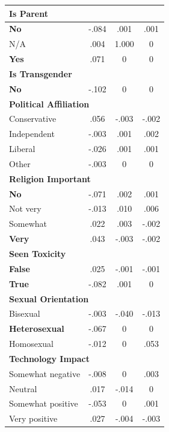 \documentclass{article} %
\theoremstyle{definition}
\theoremstyle{plain}
\begin{document}
\begin{table}[t]
\begin{tabular}{l c c c}
		\multicolumn{4}{l}{\textbf{Is Parent}} \\
		\midrule
		\textbf{No} & -.084 & .001 & .001 \\
		N/A & .004 & 1.000 & 0 \\
		\textbf{Yes} & .071 & 0 & 0 \\
		\midrule
		
		\multicolumn{4}{l}{\textbf{Is Transgender}} \\
		\midrule
		\textbf{No} & -.102 & 0 & 0 \\
		\midrule
		
		\multicolumn{4}{l}{\textbf{Political Affiliation}} \\
		\midrule
		Conservative & .056 & -.003 & -.002 \\
		Independent & -.003 & .001 & .002 \\
		Liberal & -.026 & .001 & .001 \\
		Other & -.003 & 0 & 0 \\
		\midrule
		
		\multicolumn{4}{l}{\textbf{Religion Important}} \\
		\midrule
		\textbf{No} & -.071 & .002 & .001 \\
		Not very & -.013 & .010 & .006 \\
		Somewhat & .022 & .003 & -.002 \\
		\textbf{Very} & .043 & -.003 & -.002 \\
		\midrule
		
		\multicolumn{4}{l}{\textbf{Seen Toxicity}} \\
		\midrule
		\textbf{False} & .025 & -.001 & -.001 \\
		\textbf{True} & -.082 & .001 & 0 \\
		\midrule
		
		\multicolumn{4}{l}{\textbf{Sexual Orientation}} \\
		\midrule
		Bisexual & -.003 & -.040 & -.013 \\
		\textbf{Heterosexual} & -.067 & 0 & 0 \\
		Homosexual & -.012 & 0 & .053 \\
		\midrule
		
		\multicolumn{4}{l}{\textbf{Technology Impact}} \\
		\midrule
		Somewhat negative & -.008 & 0 & .003 \\
		Neutral & .017 & -.014 & 0 \\
		Somewhat positive & -.053 & 0 & .001 \\
		Very positive & .027 & -.004 & -.003 \\
		\midrule
		

\end{tabular}
\end{table}
\end{document}
